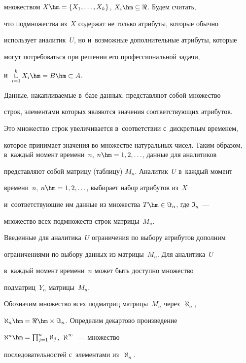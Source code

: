 множеством $X\hm= \{X_1,\ldots, X_k\}$, $X_i\hm\subseteq \Re$. Будем считать, 


что подмножества из~$X$ содержат не только атрибуты, которые обычно 


использует аналитик~$U$, но и~возможные дополнительные атрибуты, которые 


могут потребоваться при решении его профессиональной задачи, 


и~$\mathop{\cup}\limits_{i=1}^k X_i\hm=B\hm\subset A$. 


  


  Данные, накапливаемые в~базе данных, представляют собой множество 


строк, элементами которых являются значения соответствующих атрибутов. 


Это множество строк увеличивается в~соответствии с~дискретным временем, 


которое принимает значения во множестве натуральных чисел. Таким образом, в~каждый момент времени~$n$, $n\hm=1,2,\ldots$, данные для аналитиков 


представляют собой матрицу (таблицу) $M_n$. Аналитик~$U$ в~каждый момент 


времени~$n$, $n\hm=1,2,\ldots$, выбирает набор атрибутов из~$X$ 


и~соответствующие им данные из множества $T\hm\in \Im_n$, где $\Im_n$~--- 


множество всех подмножеств строк матрицы~$M_n$. 


  


  Введенные для аналитика~$U$ ограничения по выбору атрибутов дополним 


ограничениями по выбору данных из матрицы~$M_n$. Для аналитика~$U$ 


в~каждый момент времени~$n$ может быть доступно множество 


подматриц~$Y_n$ матрицы~$M_n$. 


  


  Обозначим множество всех подматриц матрицы~$M_n$ через~$\aleph_n$, 


$\aleph_n\hm=\Re\hm\times \Im_n$. Определим декартово произведение 


$\aleph^n\hm= \prod\nolimits_{j=1}^n \aleph_j$, $\aleph^\infty$~--- множество 


последовательностей с~элементами из~$\aleph_n$. 


